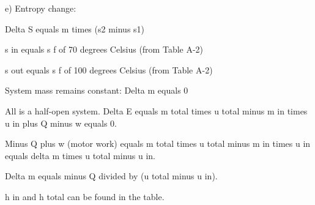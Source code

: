 e) Entropy change:  

Delta S equals m times (s2 minus s1)  

s in equals s f of 70 degrees Celsius (from Table A-2)  

s out equals s f of 100 degrees Celsius (from Table A-2)  

System mass remains constant:  
Delta m equals 0

All is a half-open system.  
Delta E equals m total times u total minus m in times u in plus Q minus w equals 0.  

Minus Q plus w (motor work) equals m total times u total minus m in times u in equals delta m times u total minus u in.  

Delta m equals minus Q divided by (u total minus u in).  

h in and h total can be found in the table.